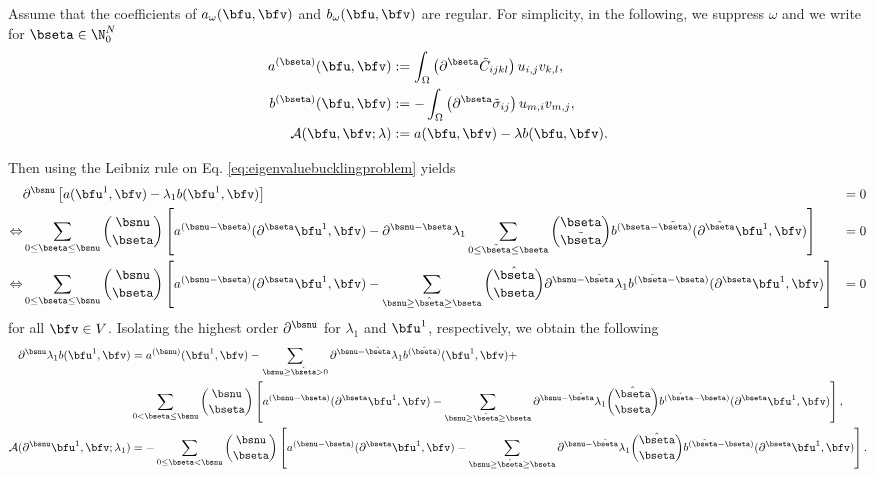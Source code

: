 Assume that the coefficients of $a_\omega  (\bfu,\bfv)$ and $b_\omega (\bfu,\bfv)$ are regular. For simplicity, in the following, we %
suppress $\omega$ and we write for $\bseta \in \N^N_0$
\begin{align}
    a^{(\bseta)}(\bfu, \bfv) &:= \int_\Omega \left(\partial^{\bseta} \tilde C_{ijkl} \right) u_{i,j} v_{k,l}, \\
    b^{(\bseta)}(\bfu, \bfv) &:= -\int_\Omega \left(\partial^{\bseta} \tilde \sigma_{ij} \right) u_{m,i} v_{m,j},  \\
    \mathcal{A}(\bfu, \bfv;\lambda) &:=  a(\bfu, \bfv)  - \lambda b(\bfu, \bfv).
\end{align}

Then using the Leibniz rule on Eq. \eqref{eq:eigenvaluebucklingproblem} yields
\begin{align*}
    &\partial^{\bsnu} \left[ a(\bfu^1, \bfv)  - \lambda_1  b(\bfu^1, \bfv) \right] &= 0 \\
    \Leftrightarrow &\sum_{0 \leq \bseta \leq \bsnu} \binom{\bsnu}{\bseta} \left[ a^{(\bsnu-\bseta)}(\partial^{\bseta}\bfu^1, \bfv) - \partial^{\bsnu - \bseta} \lambda_1 \sum_{0 \leq \tilde \bseta \leq \bseta} \binom{\bseta}{\tilde \bseta} b^{(\bseta - \tilde  \bseta )} (\partial^{\tilde \bseta} \bfu^1, \bfv) \right]  &=0 \\
    \Leftrightarrow &  \sum_{0 \leq \bseta \leq \bsnu} \binom{\bsnu}{\bseta} \left[ a^{(\bsnu-\bseta)}(\partial^{\bseta}\bfu^1, \bfv) - \sum_{\bsnu \geq \hat \bseta \geq \bseta} \binom{\hat \bseta}{\bseta} \partial^{\bsnu -\hat \bseta} \lambda_1   b^{(\hat \bseta - \bseta )} (\partial^{\bseta} \bfu^1, \bfv) \right]  &= 0 
\end{align*}
for all $\bfv \in V$.
Isolating the highest order $\partial^{\bsnu}$ for $\lambda_1$ and $\bfu^1$, respectively, we obtain the following
\begin{align*}
    \partial^{\bsnu}  \lambda_1  b(\bfu^1,\bfv) &=  a^{(\bsnu)} (\bfu^1,\bfv)  - \sum_{\bsnu \geq \hat \bseta > 0 } \partial^{\bsnu - \hat \bseta } \lambda_1  b^{(\hat \bseta)} ( \bfu^1,\bfv)  +  \\
    & \sum_{0 < \bseta \leq \bsnu} \binom{\bsnu}{\bseta} \left[ a^{(\bsnu-\bseta)}(\partial^{\bseta}\bfu^1, \bfv) - \sum_{\bsnu \geq \hat \bseta \geq \bseta} \partial^{\bsnu -\hat \bseta} \lambda_1  \binom{\hat \bseta}{\bseta} b^{(\hat \bseta - \bseta )} (\partial^{\bseta} \bfu^1, \bfv) \right], \\
    \mathcal{A}(\partial^{\bsnu} \bfu^1, \bfv;\lambda_1) &= - \sum_{0 \leq \bseta < \bsnu} \binom{\bsnu}{\bseta} \left[ a^{(\bsnu-\bseta)}(\partial^{\bseta}\bfu^1, \bfv) - \sum_{\bsnu \geq \hat \bseta \geq \bseta} \partial^{\bsnu -\hat \bseta} \lambda_1  \binom{\hat \bseta}{\bseta} b^{(\hat \bseta - \bseta )} (\partial^{\bseta} \bfu^1, \bfv) \right].
\end{align*}
